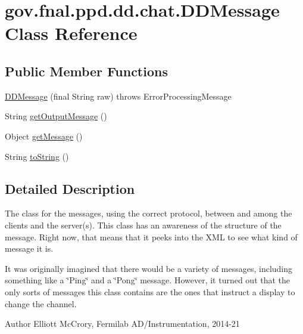 \hypertarget{classgov_1_1fnal_1_1ppd_1_1dd_1_1chat_1_1DDMessage}{\section{gov.\-fnal.\-ppd.\-dd.\-chat.\-D\-D\-Message Class Reference}
\label{classgov_1_1fnal_1_1ppd_1_1dd_1_1chat_1_1DDMessage}
}
\subsection*{Public Member Functions}
\begin{DoxyCompactItemize}
\item 
\hyperlink{classgov_1_1fnal_1_1ppd_1_1dd_1_1chat_1_1DDMessage_a4e12b6c5ebadc164c409b32516612c61}{D\-D\-Message} (final String raw)  throws Error\-Processing\-Message 
\item 
String \hyperlink{classgov_1_1fnal_1_1ppd_1_1dd_1_1chat_1_1DDMessage_a01b517b9e7b2acc2524cbd92c76d7fa6}{get\-Output\-Message} ()
\item 
Object \hyperlink{classgov_1_1fnal_1_1ppd_1_1dd_1_1chat_1_1DDMessage_ae33fd36c9f1fe620862f668cf58d11cc}{get\-Message} ()
\item 
String \hyperlink{classgov_1_1fnal_1_1ppd_1_1dd_1_1chat_1_1DDMessage_a632b738d2bc786effaa8b5b58aff590f}{to\-String} ()
\end{DoxyCompactItemize}


\subsection{Detailed Description}
The class for the messages, using the correct protocol, between and among the clients and the server(s). This class has an awareness of the structure of the message. Right now, that means that it peeks into the X\-M\-L to see what kind of message it is.

It was originally imagined that there would be a variety of messages, including something like a \char`\"{}\-Ping\char`\"{} and a \char`\"{}\-Pong\char`\"{} message. However, it turned out that the only sorts of messages this class contains are the ones that instruct a display to change the channel.

\begin{DoxyAuthor}{Author}
Elliott Mc\-Crory, Fermilab A\-D/\-Instrumentation, 2014-\/21 
\end{DoxyAuthor}


